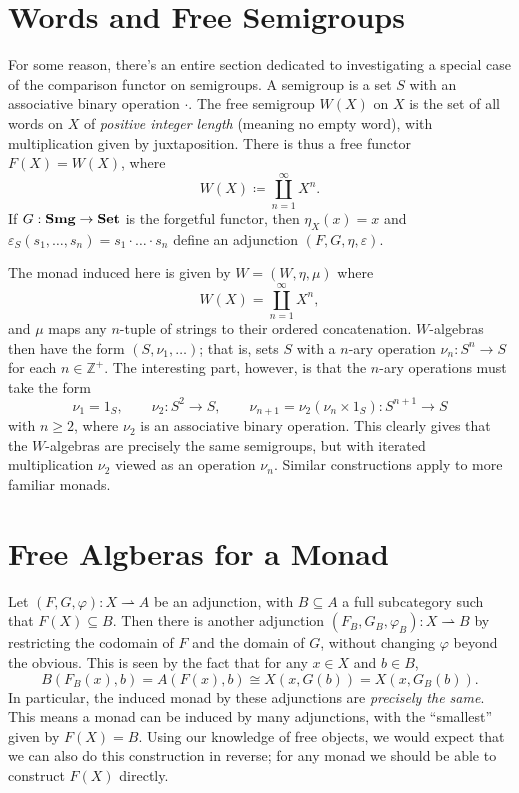 \section{Words and Free Semigroups}

For some reason, there's an entire section dedicated to investigating a special case of the comparison functor on semigroups. A semigroup is a set $S$ with an associative binary operation $\cdot $. The free semigroup $W(X)$ on $X$ is the set of all words on $X$ of \emph{positive integer length} (meaning no empty word), with multiplication given by juxtaposition. There is thus a free functor $F(X)=W(X)$, where
\[
	W(X)\coloneqq \coprod_{n=1}^\infty X^n
.\]
If $G : \mathbf{Smg}  \to \mathbf{Set} $ is the forgetful functor, then $\eta_X(x)=x$ and $\varepsilon_S(s_1, \ldots ,s_n)=s_1 \cdot \ldots \cdot s_n$ define an adjunction $(F,G,\eta,\varepsilon )$.


The monad induced here is given by $W=(W,\eta,\mu)$ where
\[
	W(X)=\coprod_{n=1}^\infty X^n,
\]
and $\mu$ maps any $n$-tuple of strings to their ordered concatenation. $W$-algebras then have the form $(S,\nu_1, \ldots )$; that is, sets $S$ with a $n$-ary operation $\nu_n : S^n \to S$ for each $n\in\mathbb{Z}^+ $. The interesting part, however, is that the $n$-ary operations must take the form
\[
	\nu_1 = 1_S,\qquad \nu_2 : S^2 \to S,\qquad \nu_{n+1} =\nu_2(\nu_n \times 1_S) : S^{n+1}  \to S
\]
with $n\geq 2$, where $\nu_2$ is an associative binary operation. This clearly gives that the $W$-algebras are precisely the same semigroups, but with iterated multiplication $\nu_2$ viewed as an operation $\nu_n$. Similar constructions apply to more familiar monads.

\section{Free Algberas for a Monad}

Let $(F,G,\varphi) : X\rightharpoonup A$ be an adjunction, with $B\subseteq A$ a full subcategory such that $F(X)\subseteq B$. Then there is another adjunction $(F_B,G_B,\varphi_B) : X\rightharpoonup B$ by restricting the codomain of $F$ and the domain of $G$, without changing $\varphi$ beyond the obvious. This is seen by the fact that for any $x\in X$ and $b\in B$,
\[
	B(F_B(x),b)=A(F(x),b)\cong X(x,G(b))=X(x,G_B(b))
.\]
In particular, the induced monad by these adjunctions are \emph{precisely the same}. This means a monad can be induced by many adjunctions, with the ``smallest'' given by $F(X)=B$. Using our knowledge of free objects, we would expect that we can also do this construction in reverse; for any monad we should be able to construct $F(X)$ directly.

